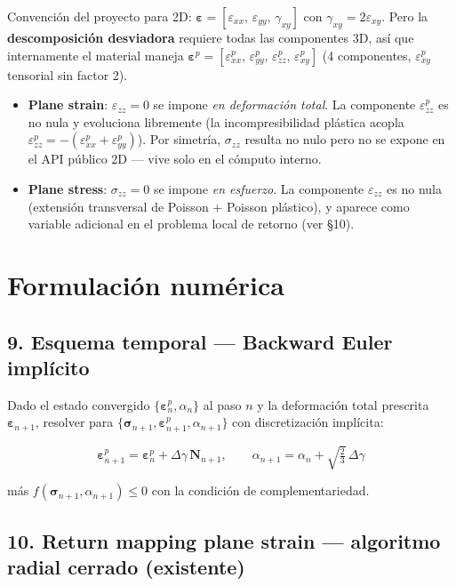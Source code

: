 \documentclass[11pt,letterpaper,oneside]{report}
\begin{document}
Convención del proyecto para 2D: $\boldsymbol\varepsilon = [\varepsilon_{xx},\,\varepsilon_{yy},\,\gamma_{xy}]$ con $\gamma_{xy} = 2\varepsilon_{xy}$. Pero la \textbf{descomposición desviadora} requiere todas las componentes 3D, así que internamente el material maneja $\boldsymbol\varepsilon^p = [\varepsilon^p_{xx},\,\varepsilon^p_{yy},\,\varepsilon^p_{zz},\,\varepsilon^p_{xy}]$ (4 componentes, $\varepsilon^p_{xy}$ tensorial sin factor 2).

\begin{itemize}
  \item \textbf{Plane strain}: $\varepsilon_{zz} = 0$ se impone \textit{en deformación total}. La componente $\varepsilon^p_{zz}$ es no nula y evoluciona libremente (la incompresibilidad plástica acopla $\varepsilon^p_{zz} = -(\varepsilon^p_{xx} + \varepsilon^p_{yy})$). Por simetría, $\sigma_{zz}$ resulta no nulo pero no se expone en el API público 2D --- vive solo en el cómputo interno.
  \item \textbf{Plane stress}: $\sigma_{zz} = 0$ se impone \textit{en esfuerzo}. La componente $\varepsilon_{zz}$ es no nula (extensión transversal de Poisson + Poisson plástico), y aparece como variable adicional en el problema local de retorno (ver §10).
\end{itemize}


\section{Formulación numérica}

\subsection{9. Esquema temporal --- Backward Euler implícito}

Dado el estado convergido $\{\boldsymbol\varepsilon^p_n, \alpha_n\}$ al paso $n$ y la deformación total prescrita $\boldsymbol\varepsilon_{n+1}$, resolver para $\{\boldsymbol\sigma_{n+1}, \boldsymbol\varepsilon^p_{n+1}, \alpha_{n+1}\}$ con discretización implícita:

\[
\boldsymbol\varepsilon^p_{n+1} = \boldsymbol\varepsilon^p_n + \Delta\gamma\,\mathbf N_{n+1}, \qquad \alpha_{n+1} = \alpha_n + \sqrt{\tfrac{2}{3}}\,\Delta\gamma
\]

más $f(\boldsymbol\sigma_{n+1}, \alpha_{n+1}) \leq 0$ con la condición de complementariedad.

\subsection{10. Return mapping plane strain --- \textbf{algoritmo radial cerrado} (existente)}
\end{document}
